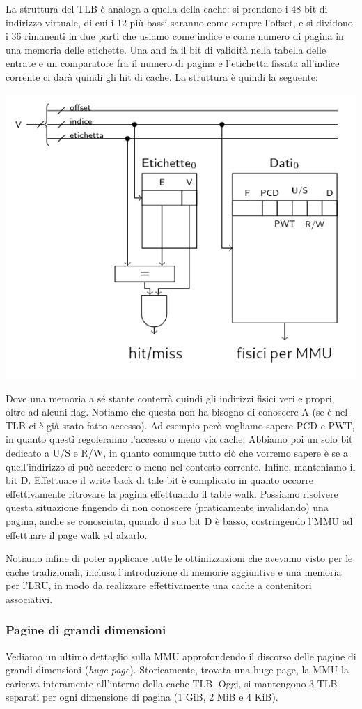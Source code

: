 \documentclass[a4paper,11pt]{article}
\begin{document}
La struttura del TLB è analoga a quella della cache: si prendono i 48 bit di indirizzo virtuale, di cui i 12 più bassi saranno come sempre l'offset, e si dividono i 36 rimanenti in due parti che usiamo come indice e come numero di pagina in una memoria delle etichette.
Una and fa il bit di validità nella tabella delle entrate e un comparatore fra il numero di pagina e l'etichetta fissata all'indice corrente ci darà quindi gli hit di cache.
La struttura è quindi la seguente:
\begin{center}
	\includegraphics[scale=0.8]{../figures/tlb.png}
\end{center}
Dove una memoria a sé stante conterrà quindi gli indirizzi fisici veri e propri, oltre ad alcuni flag.
Notiamo che questa non ha bisogno di conoscere A (se è nel TLB ci è già stato fatto accesso).
Ad esempio però vogliamo sapere PCD e PWT, in quanto questi regoleranno l'accesso o meno via cache.
Abbiamo poi un solo bit dedicato a U/S e R/W, in quanto comunque tutto ciò che vorremo sapere è se a quell'indirizzo si può accedere o meno nel contesto corrente.
Infine, manteniamo il bit D.
Effettuare il write back di tale bit è complicato in quanto occorre effettivamente ritrovare la pagina effettuando il table walk.
Possiamo risolvere questa situazione fingendo di non conoscere (praticamente invalidando) una pagina, anche se conosciuta, quando il suo bit D è basso, costringendo l'MMU ad effettuare il page walk ed alzarlo. 

Notiamo infine di poter applicare tutte le ottimizzazioni che avevamo visto per le cache tradizionali, inclusa l'introduzione di memorie aggiuntive e una memoria per l'LRU, in modo da realizzare effettivamente una cache a contenitori associativi.

\subsubsection{Pagine di grandi dimensioni}
Vediamo un ultimo dettaglio sulla MMU approfondendo il discorso delle pagine di grandi dimensioni (\textit{huge page}).
Storicamente, trovata una huge page, la MMU la caricava interamente all'interno della cache TLB.
Oggi, si mantengono 3 TLB separati per ogni dimensione di pagina (1 GiB, 2 MiB e 4 KiB).
\end{document}
